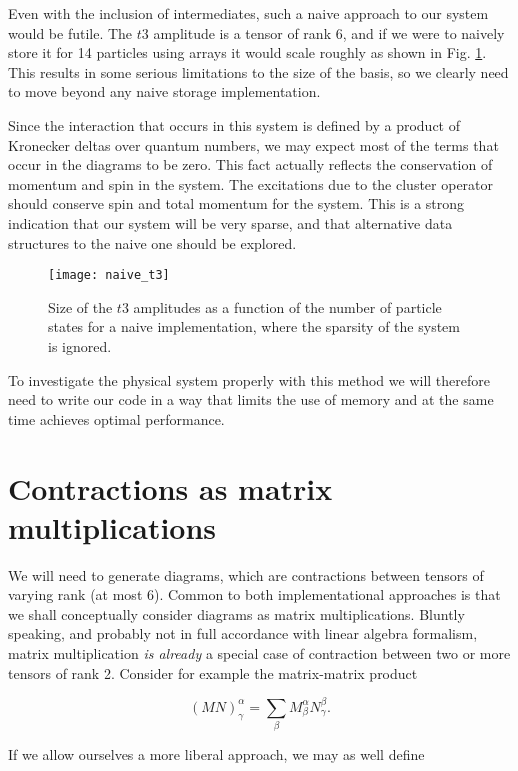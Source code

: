 Even with the inclusion of intermediates, such a naive approach to our system would be futile. The $t3$ amplitude is a tensor of rank 6, and if we were to naively store it for 14 particles using arrays it would scale roughly as shown in Fig. \ref{fig:naive_t3}. This results in some serious limitations to the size of the basis, so we clearly need to move beyond any naive storage implementation.

Since the interaction that occurs in this system is defined by a product of Kronecker deltas over quantum numbers, we may expect most of the terms that occur in the diagrams to be zero. This fact actually reflects the conservation of momentum and spin in the system. The excitations due to the cluster operator should conserve spin and total momentum for the system. This is a strong indication that our system will be very sparse, and that alternative data structures to the naive one should be explored.

\begin{figure}[p]
    \centering
    \texttt{[image: naive\_t3]}
    \caption{Size of the $t3$ amplitudes as a function of the number of particle states for a naive implementation, where the sparsity of the system is ignored.}
    \label{fig:naive_t3}
\end{figure}

To investigate the physical system properly with this method we will therefore need to write our code in a way that limits the use of memory and at the same time achieves optimal performance. 


\section{Contractions as matrix multiplications}

We will need to generate diagrams, which are contractions between tensors of varying rank (at most 6). Common to both implementational approaches is that we shall conceptually consider diagrams as matrix multiplications. Bluntly speaking, and probably not in full accordance with linear algebra formalism, matrix multiplication  \emph{is already} a special case of contraction between two or more tensors of rank 2. Consider for example the matrix-matrix product

\begin{equation}
(MN)^\alpha_\gamma = \sum_\beta M^\alpha_\beta N^\beta_\gamma .
\end{equation}

If we allow ourselves a more liberal approach, we may as well define

